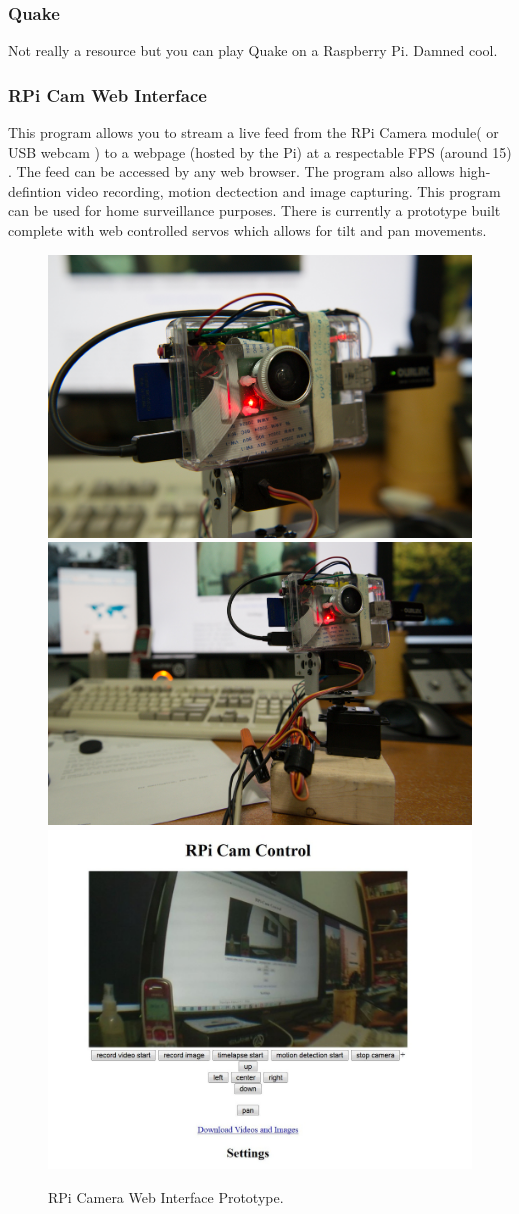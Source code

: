 		
		\subsubsection{Quake}
		
			Not really a resource but you can play Quake on a Raspberry Pi.
			Damned cool.
			
		
		\subsubsection{RPi Cam Web Interface}

			This program allows you to stream a live feed from the RPi Camera module( or USB webcam ) to a webpage (hosted by the Pi) at a respectable FPS (around 15) . The feed can be accessed by any web browser. The program also allows high-defintion video recording, motion dectection and image capturing. This program can be used for home surveillance purposes. There is currently a prototype built complete with web controlled servos which allows for tilt and pan movements.

			\begin{figure}
				\centering
				\caption{RPi Camera Web Interface Prototype.}
				\includegraphics[width=.45\textwidth]{gfx/picam.jpg} \includegraphics[width=.45\textwidth]{gfx/picam2.jpg}
				\includegraphics[width=.45\textwidth]{gfx/picam3.jpg}
			\end{figure}
		
